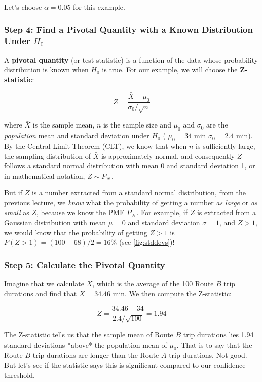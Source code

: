 Let's choose $\alpha=0.05$ for this example.

\subsubsection*{Step 4: Find a Pivotal Quantity with a Known Distribution Under $H_0$}
A \textbf{pivotal quantity} (or test statistic) is a function of the data whose probability distribution is known when $H_0$ is true. For our example, we will choose the \textbf{Z-statistic}:

\begin{equation}
    Z = \frac{\bar{X} - \mu_0}{\sigma_0 / \sqrt{n}}
\end{equation}

\noindent where $\bar{X}$ is the sample mean, $n$ is the sample size and $\mu_0$ and $\sigma_0$ are the \textit{population} mean and standard deviation under $H_0$ (\ie{} $\mu_0=34\text{ min}$ $\sigma_0=2.4\text{ min}$). By the Central Limit Theorem (CLT), we know that when $n$ is sufficiently large, the sampling distribution of $\bar{X}$ is approximately normal, and consequently $Z$ follows a standard normal distribution with mean 0 and standard deviation 1, or in mathematical notation, $Z \sim P_\mathcal{N}$.

But if $Z$ is a number extracted from a standard normal distribution, from the previous lecture, we \textit{know} what the probability of getting a number \textit{as large} or \textit{as small} as $Z$, because we know the PMF $P_\mathcal{N}$. For example, if $Z$ is extracted from a Gaussian distribution with mean $\mu=0$ and standard deviation $\sigma=1$, and $Z>1$, we would know that the probability of getting $Z>1$ is $P(Z>1) = (100-68)/2 = 16$\% (see \autoref{fig:stddevs})!

\subsubsection*{Step 5: Calculate the Pivotal Quantity}
Imagine that we calculate $\bar{X}$, which is the average of the 100 Route $B$ trip durations and find that $\bar{X}=34.46\text{ min}$. We then compute the Z-statistic:

\begin{equation}
    Z = \frac{34.46 - 34}{2.4 / \sqrt{100}} = 1.94
\end{equation}

The Z-statistic tells us that the sample mean of Route $B$ trip durations lies 1.94 standard deviations *above* the population mean of $\mu_0$. That is to say that the Route $B$ trip durations are longer than the Route $A$ trip durations. Not good. But let's see if the statistic says this is significant compared to our confidence threshold.


